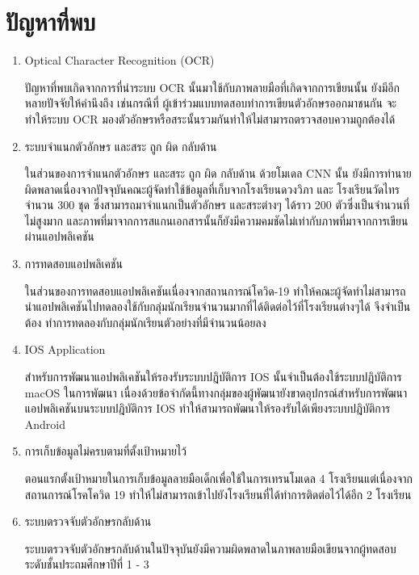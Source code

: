 \documentclass[12pt,oneside,openright,a4paper]{cpe-thai-project}
\begin{document}
\section{ปัญหาที่พบ}
\begin{enumerate}
  \item Optical Character Recognition (OCR)\par
        ปัญหาที่พบเกิดจากการที่นำระบบ OCR นั้นมาใช้กับภาพลายมือที่เกิดจากการเขียนนั้น ยังมีอีกหลายปัจจัยให้คำนึงถึง เช่นกรณีที่ ผู้เข้าร่วมแบบทดสอบทำการเขียนตัวอักษรออกมาชนกัน
        จะทำให้ระบบ OCR มองตัวอักษรหรือสระนั้นรวมกันทำให้ไม่สามารถตรวจสอบความถูกต้องได้
  \item ระบบจำแนกตัวอักษร และสระ ถูก ผิด กลับด้าน\par
        ในส่วนของการจำแนกตัวอักษร และสระ ถูก ผิด กลับด้าน ด้วยโมเดล CNN นั้น ยังมีการทำนายผิดพลาดเนื่องจากปัจจุบันคณะผู้จัดทำใช้ข้อมูลที่เก็บจากโรงเรียนดวงวิภา และ โรงเรียนวัดไทร จำนวน 300 ชุด
        ซึ่งสามารถมาจำแนกเป็นตัวอักษร และสระต่างๆ ได้ราว 200 ตัวซึ่งเป็นจำนวนที่ไม่สูงมาก และภาพที่มาจากการสแกนเอกสารนั้นก็ยังมีความคมชัดไม่เท่ากับภาพที่มาจากการเขียนผ่านแอปพลิเคชัน
  \item การทดสอบแอปพลิเคชัน\par
        ในส่วนของการทดสอบแอปพลิเคชันเนื่องจากสถานการณ์โควิด-19 ทำให้คณะผู้จัดทำไม่สามารถนำแอปพลิเคชันไปทดลองใช้กับกลุ่มนักเรียนจำนวนมากที่ได้ติดต่อไว้ที่โรงเรียนต่างๆได้ จึงจำเป็นต้อง
        ทำการทดลองกับกลุ่มนักเรียนตัวอย่างที่มีจำนวนน้อยลง  
  \item IOS Application\par
  สำหรับการพัฒนาแอปพลิเคชันให้รองรับระบบปฎิบัติการ IOS  นั้นจำเป็นต้องใช้ระบบปฎิบัติการ macOS ในการพัฒนา เนื่องด้วยข้อจำกัดนี้ทางกลุ่มของผู้พัฒนายังขาดอุปกรณ์สำหรับการพัฒนาแอปพลิเคชันบนระบบปฎิบัติการ IOS ทำให้สามารถพัฒนาให้รองรับได้เพียงระบบปฎิบัติการ Android
  \item การเก็บข้อมูลไม่ครบตามที่ตั้งเป้าหมายไว้\par
  ตอนแรกตั้งเป้าหมายในการเก็บข้อมูลลายมือเด็กเพื่อใช้ในการเทรนโมเดล 4 โรงเรียนแต่เนื่องจากสถานการณ์โรคโควิด 19 ทำให้ไม่สามารถเข้าไปยังโรงเรียนที่ได้ทำการติดต่อไว้ได้อีก 2 โรงเรียน
  \item ระบบตรวจจับตัวอักษรกลับด้าน\par
  ระบบตรวจจับตัวอักษรกลับด้านในปัจจุบันยังมีความผิดพลาดในภาพลายมือเขียนจากผู้ทดสอบระดับชั้นประถมศึกษาปีที่ 1 - 3 
\end{enumerate}
\end{document}
